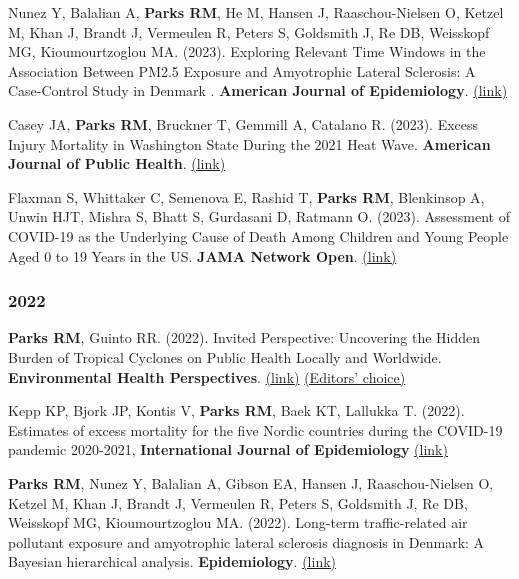 {\noindent Nunez Y, Balalian A, \textbf{Parks RM}, He M, Hansen J, Raaschou-Nielsen O, Ketzel M, Khan J, Brandt J, Vermeulen R, Peters S, Goldsmith J, Re DB, Weisskopf MG, Kioumourtzoglou MA. (2023). Exploring Relevant Time Windows in the Association Between PM2.5 Exposure and Amyotrophic Lateral Sclerosis: A Case-Control Study in Denmark . \textbf{American Journal of Epidemiology}. \href{https://academic.oup.com/aje/advance-article-abstract/doi/10.1093/aje/kwad099/7135818?redirectedFrom=fulltext&login=false}{(link)}\smallskip

\noindent Casey JA, \textbf{Parks RM}, Bruckner T, Gemmill A, Catalano R. (2023). Excess Injury Mortality in Washington State During the 2021 Heat Wave. \textbf{American Journal of Public Health}. \href{https://ajph.aphapublications.org/doi/abs/10.2105/AJPH.2023.307269}{(link)}\smallskip

\noindent Flaxman S, Whittaker C, Semenova E, Rashid T, \textbf{Parks RM}, Blenkinsop A, Unwin HJT, Mishra S, Bhatt S, Gurdasani D, Ratmann O. (2023). Assessment of COVID-19 as the Underlying Cause of Death Among Children and Young People Aged 0 to 19 Years in the US. \textbf{JAMA Network Open}. \href{https://jamanetwork.com/journals/jamanetworkopen/fullarticle/2800816}{(link)}

\subsubsection*{2022}

\noindent \textbf{Parks RM}, Guinto RR. (2022). Invited Perspective: Uncovering the Hidden Burden of Tropical Cyclones on Public Health Locally and Worldwide. \textbf{Environmental Health Perspectives}. \href{https://ehp.niehs.nih.gov/doi/10.1289/EHP12241}{(link)} \href{https://ehp.niehs.nih.gov/curated-collections/eds-choice-2022}{(Editors' choice)}  \smallskip

\noindent Kepp KP, Bjork JP, Kontis V, \textbf{Parks RM}, Baek KT, Lallukka T. (2022). Estimates of excess mortality for the five Nordic countries during the COVID-19 pandemic 2020-2021, \textbf{International Journal of Epidemiology} \href{https://academic.oup.com/ije/advance-article/doi/10.1093/ije/dyac204/6798817#379089278}{(link)} \smallskip

\noindent \textbf{Parks RM}, Nunez Y, Balalian A,  Gibson EA, Hansen J, Raaschou-Nielsen O, Ketzel M, Khan J, Brandt J, Vermeulen R, Peters S, Goldsmith J, Re DB, Weisskopf MG, Kioumourtzoglou MA. (2022). Long-term traffic-related air pollutant exposure and amyotrophic lateral sclerosis diagnosis in Denmark: A Bayesian hierarchical analysis. \textbf{Epidemiology}. \href{https://journals.lww.com/epidem/Abstract/9900/Long_term_traffic_related_air_pollutant_exposure.55.aspx}{(link)} \smallskip

}
